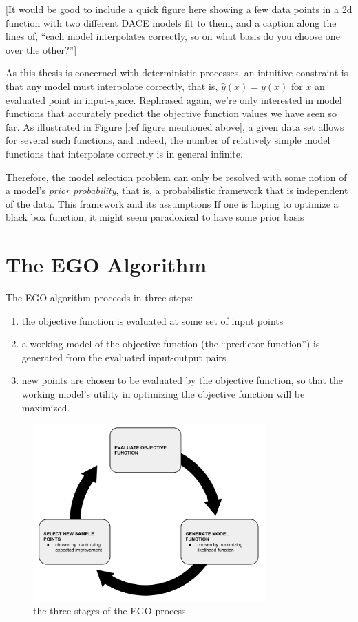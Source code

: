 \documentclass[letterpaper]{article}
\begin{document}
[It would be good to include a quick figure here showing a few data points in a 2d function with two different DACE models fit to them, and a caption along the lines of, ``each model interpolates correctly, so on what basis do you choose one over the other?'']

As this thesis is concerned with deterministic processes, an intuitive constraint is that any model must interpolate correctly, that is, $\hat{y}(x) = y(x)$ for $x$ an evaluated point in input-space. Rephrased again, we're only interested in model functions that accurately predict the objective function values we have seen so far. As illustrated in Figure [ref figure mentioned above], a given data set allows for several such functions, and indeed, the number of relatively simple model functions that interpolate correctly is in general infinite.

Therefore, the model selection problem can only be resolved with some notion of a model's \emph{prior probability}, that is, a probabilistic framework that is independent of the data. This framework and its assumptions
If one is hoping to optimize a black box function, it might seem paradoxical to have some prior basis



\section{The EGO Algorithm}
The EGO algorithm \cite{jones_efficient_1998} proceeds in three steps:

\begin{enumerate}
\item the objective function is evaluated at some set of input points
\item a working model of the objective function (the ``predictor function'') is generated from the evaluated input-output pairs
\item new points are chosen to be evaluated by the objective function, so that the working model's utility in optimizing the objective function will be maximized.
\end{enumerate}


\begin{figure}
	\centering
	\includegraphics[width=0.8\textwidth]{EGO_cycle_v1}
	\caption{the three stages of the EGO process}
	\label{fig:ego_cycle}

\end{figure}
\end{document}
